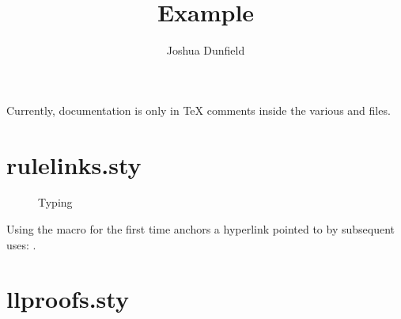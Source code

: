 \documentclass{purple}
\title{Example}
\author{Joshua Dunfield}
\newcommand{\macroname}[1]{\texttt{\Backslash}\textvtt{#1}}
\begin{document}
\maketitle

Currently, documentation is only in TeX comments inside the various  and  files.

\section{rulelinks.sty}

\begin{figure}[htbp]
  \centering

  \begin{mathpar}
  \end{mathpar}
  
  \caption{Typing}
  \label{fig:typing}
\end{figure}

Using the macro \macroname{EVar} for the first time anchors a hyperlink pointed to
by subsequent uses: \EVar.



\clearpage

\section{llproofs.sty}

\newcommand{\ctxoutsym}{{\dashv}}
\newcommand{\ctxout}[1]{\mathrel{\ctxoutsym}{#1}}

\newcommand{\judgetp}[2]{{#1} \entails {#2}}
\newcommand{\judgetpPf}[3]{\Pf{#1}{\entails}{#2}{#3}}

\newcommand{\declsynjudg}[3]{{#1} \entails {#2} \Rightarrow {#3}}
\newcommand{\declsynjudgPf}[4]{\ePf{#1}{{#2} \Rightarrow {#3}}{#4}}
\newcommand{\synjudg}[4]{{#1} \entails {#2} \Rightarrow {#3} \ctxout{#4}}
\newcommand{\synjudgPf}[5]{\ePf{#1}{{#2} \Rightarrow {#3} \ctxout{#4}}{#5}}

\newcommand{\substextendsym}{\longrightarrow}
\newcommand{\substextend}[2]{{#1} \substextendsym {#2}}
\newcommand{\substextendPf}[3]{\Pf{#1}{\substextendsym}{#2}{#3}}
\end{document}

